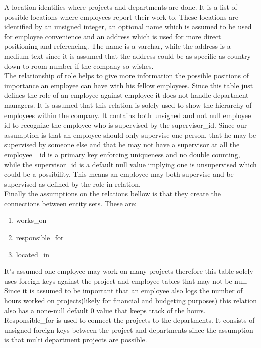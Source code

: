 \documentclass[11pt,letterpaper]{article}
\begin{document}
A location identifies where projects and departments are done. It is a list of possible locations where employees report their work to. These locations are identified by an unsigned integer, an optional name which is assumed to be used for employee convenience and an address which is used for more direct positioning and referencing. The name is a varchar, while the address is a medium text since it is assumed that the address could be as specific as country down to room number if the company so wishes.\\

The relationship of role helps to give more information the possible positions of importance an employee can have with his fellow employees. Since this table just defines the role of an employee against employee it does not handle department managers. It is assumed that this relation is solely used to show the hierarchy of employees within the company. It contains both unsigned and not null employee id to recognize the employee who is supervised by the supervisor\_id. Since our assumption is that an employee should only supervise one person, that he may be supervised by someone else and that he may not have a supervisor at all the employee \_id is a primary key enforcing uniqueness and no double counting, while the supervisor\_id is a default null value implying one is unsupervised which could be a possibility. This means an employee may both supervise and be supervised as defined by the role in relation.\\

Finally the assumptions on the relations bellow is that they create the connections between entity sets. These are:
\begin{enumerate}[]
	\item works\_on
	\item responsible\_for
	\item located\_in
\end{enumerate}
It's assumed one employee may work on many projects therefore this table solely uses foreign keys against the project and employee tables that may not be null. Since it is assumed to be important that an employee also logs the number of hours worked on projects(likely for financial and budgeting purposes) this relation also has a none-null default 0 value that keeps track of the hours.\\

Responsible\_for is used to connect the projects to the departments. It consists of unsigned foreign keys between the project and departments since the assumption is that multi department projects are possible.\\
\end{document}

